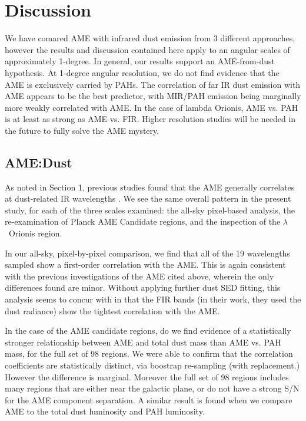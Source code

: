 \documentclass[preprint2,longabstract]{aastex}
\begin{document}
\section{Discussion}
  \label{sec:discussion}

  We have comared AME with infrared dust emission from 3 different approaches, however the results and discussion contained here apply to an angular scales of approximately 1-degree. In general, our results support an AME-from-dust hypothesis. At 1-degree angular resolution, we do not find evidence that the AME is exclusively carried by PAHs. The correlation of far IR dust emission with AME appears to be the best predictor, with MIR/PAH emission being marginally more weakly correlated with AME. In the case of lambda Orionis, AME vs. PAH is at least as strong as AME vs. FIR. Higher resolution studies will be needed in the future to fully solve the AME mystery.

      \subsection{AME:Dust}

        As noted in Section 1, previous studies found that the AME generally correlates at dust-related IR wavelengths \citep{ysard10b,planckXV, hensley16}. We see the same overall pattern in the present study, for each of the three scales examined: the all-sky pixel-based analysis, the re-examination of Planck AME Candidate regions, and the inspection of the $\lambda$~Orionis region.

         In our all-sky, pixel-by-pixel comparison, we find that all of the 19 wavelengths sampled show a first-order correlation with the AME. This is again consistent with the previous investigations of the AME cited above, wherein the only differences found are minor. Without applying further dust SED fitting, this analysis seems to concur with \cite{hensley16} in that the FIR bands (in their work, they used the dust radiance) show the tightest correlation with the AME.

        In the case of the AME candidate regions, do we find evidence of a statistically stronger relationship between AME and total dust mass than AME vs. PAH mass, for the full set of 98 regions. We were able to confirm that the correlation coefficients are statistically distinct, via boostrap re-sampling (with replacement.) However the difference is marginal. Moreover the full set of 98 regions includes many regions that are either near the galactic plane, or do not have a strong S/N for the AME component separation. A similar result is found when we compare AME to the total dust luminosity and PAH luminosity.
\end{document}

